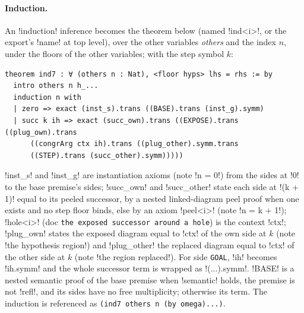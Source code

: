 \paragraph{Induction.} An \code!induction! inference becomes the theorem below (named \code!ind<i>!, or the export's \code!name! at top level), over the other variables \textit{others} and the index $n$, under the floors of the other variables; with the step symbol $k$:
\begin{lstlisting}[style=lean]
theorem ind7 : ∀ (others n : Nat), <floor hyps> lhs = rhs := by
  intro others n h_...
  induction n with
  | zero => exact (inst_s).trans ((BASE).trans (inst_g).symm)
  | succ k ih => exact (succ_own).trans ((EXPOSE).trans ((plug_own).trans
      ((congrArg ctx ih).trans ((plug_other).symm.trans
      ((STEP).trans (succ_other).symm)))))
\end{lstlisting}
\code!inst_s! and \code!inst_g! are instantiation axioms (note \code!n = 0!) from the sides at \code!0! to the base premise's sides; \code!succ_own! and \code!succ_other! state each side at \code!(k + 1)! equal to its peeled successor, by a nested linked-diagram peel proof when one exists and no step floor binds, else by an axiom \code!peel<i>! (note \code!n = k + 1!); \code!hole<i>! (doc \texttt{the exposed successor around a hole}) is the context \code!ctx!; \code!plug_own! states the exposed diagram equal to \code!ctx! of the own side at $k$ (note \code!the hypothesis region!) and \code!plug_other! the replaced diagram equal to \code!ctx! of the other side at $k$ (note \code!the region replaced!). For side \texttt{GOAL}, \code!ih! becomes \code!ih.symm! and the whole successor term is wrapped as \code!(...).symm!. \code!BASE! is a nested semantic proof of the base premise when \code!semantic! holds, the premise is not \code!refl!, and its sides have no free multiplicity; otherwise its term. The induction is referenced as \texttt{(\allowbreak{}ind7 others n (\allowbreak{}by omega).\allowbreak{}.\allowbreak{}.\allowbreak{})}.

